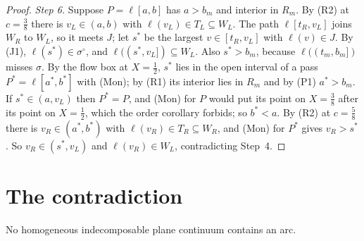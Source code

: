 \begin{proof}
\emph{Step 6.} Suppose $P=\ell[a,b]$ has $a>b_m$ and interior in $R_m$. By (R2) at $c=\frac38$ there is $v_L\in(a,b)$ with $\ell(v_L)\in T_L\subseteq W_L$.
The path $\ell[t_R,v_L]$ joins $W_R$ to $W_L$, so it meets $J$; let $s^*$ be the largest $v\in[t_R,v_L]$ with $\ell(v)\in J$. By (J1),
$\ell(s^*)\in\sigma^\circ$, and $\ell((s^*,v_L])\subseteq W_L$. Also $s^*>b_m$, because $\ell((t_m,b_m])$ misses $\sigma$. By the flow box at $X=\frac12$, $s^*$
lies in the open interval of a pass $P^*=\ell[a^*,b^*]$ with (Mon); by (R1) its interior lies in $R_m$ and by (P1) $a^*>b_m$. If $s^*\in(a,v_L)$ then
$P^*=P$, and (Mon) for $P$ would put its point on $X=\frac38$ after its point on $X=\frac12$, which the order corollary forbids; so $b^*<a$. By
(R2) at $c=\frac58$ there is $v_R\in(a^*,b^*)$ with $\ell(v_R)\in T_R\subseteq W_R$, and (Mon) for $P^*$ gives $v_R>s^*$. So $v_R\in(s^*,v_L)$ and
$\ell(v_R)\in W_L$, contradicting Step~4.
\end{proof}


\section{The contradiction}

\begin{theorem}\label{thm:noarc}
No homogeneous indecomposable plane continuum contains an arc.
\end{theorem}

